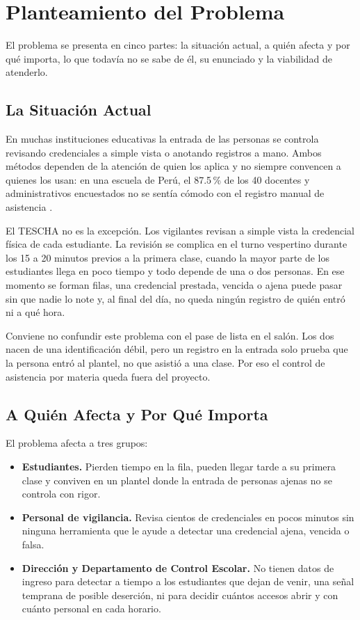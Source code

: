 \section{Planteamiento del Problema}
\label{sec:problema}
El problema se presenta en cinco partes: la situación actual, a quién afecta y
por qué importa, lo que todavía no se sabe de él, su enunciado y la viabilidad
de atenderlo.

\subsection{La Situación Actual}
En muchas instituciones educativas la entrada de las personas se controla
revisando credenciales a simple vista o anotando registros a mano. Ambos
métodos dependen de la atención de quien los aplica y no siempre convencen a
quienes los usan: en una escuela de Perú, el 87.5\,\% de los 40 docentes y
administrativos encuestados no se sentía cómodo con el registro manual de
asistencia \parencite{torres2019qr}.

El TESCHA no es la excepción. Los vigilantes revisan a simple vista la
credencial física de cada estudiante. La revisión se complica en el turno
vespertino durante los 15 a 20 minutos previos a la primera clase, cuando la
mayor parte de los estudiantes llega en poco tiempo y todo depende de una o
dos personas. En ese momento se forman filas, una credencial prestada, vencida
o ajena puede pasar sin que nadie lo note y, al final del día, no queda ningún
registro de quién entró ni a qué hora.

Conviene no confundir este problema con el pase de lista en el salón. Los dos
nacen de una identificación débil, pero un registro en la entrada solo prueba
que la persona entró al plantel, no que asistió a una clase. Por eso el
control de asistencia por materia queda fuera del proyecto.

\subsection{A Quién Afecta y Por Qué Importa}
El problema afecta a tres grupos:
\begin{itemize}
	\item \textbf{Estudiantes.} Pierden tiempo en la fila, pueden llegar tarde a
	      su primera clase y conviven en un plantel donde la entrada de personas
	      ajenas no se controla con rigor.
	\item \textbf{Personal de vigilancia.} Revisa cientos de credenciales en
	      pocos minutos sin ninguna herramienta que le ayude a detectar una
	      credencial ajena, vencida o falsa.
	\item \textbf{Dirección y Departamento de Control Escolar.} No tienen datos
	      de ingreso para detectar a tiempo a los estudiantes que dejan de venir,
	      una señal temprana de posible deserción, ni para decidir cuántos accesos
	      abrir y con cuánto personal en cada horario.
\end{itemize}

